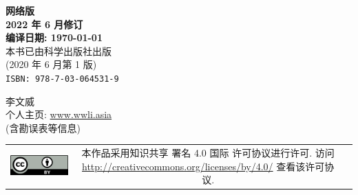 \begin{titlepage}
\clearpage	%
\begin{center}
	\Large{\sffamily\bfseries\thmheiti 网络版 \\ 2022 年 6 月修订} \\ \vspace{2em}
	\Large{\sffamily\bfseries\thmheiti 编译日期: \today} \\ \vspace{1em}
	本书已由科学出版社出版 \\
	(2020 年 6 月第 1 版) \\
	\texttt{ISBN: 978-7-03-064531-9}
\end{center}
\vfill


\begin{flushleft} \small
	李文威 \\
	个人主页: \href{https://www.wwli.asia}{www.wwli.asia} \\
	(含勘误表等信息)
\end{flushleft}
\vspace{1.5em}
\begin{tabular*}{\textwidth}{ccc}
	\includegraphics{ccby.png}
	& \begin{minipage}[b]{0.6\textwidth}
		\small\sffamily
		本作品采用知识共享 署名 4.0 国际 许可协议进行许可. 访问 \url{http://creativecommons.org/licenses/by/4.0/} 查看该许可协议.
	\end{minipage}
\end{tabular*}

\cleardoublepage
\end{titlepage}
